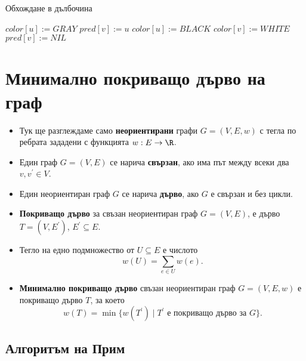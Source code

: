 \begin{algorithm}
  \caption{Обхождане в дълбочина}
  \label{alg:dfs-visit}
  \begin{algorithmic}[1]
    \State $color[u] := GRAY$
    \State $pred[v] := u$
    \State {}
    \EndIf
    \EndFor
    \State $color[u] := BLACK$
    \EndProcedure
    \Statex
    \State $color[v] := WHITE$
    \State $pred[v] := NIL$
    \EndFor    
    \State{}
    \EndIf
    \EndFor
    \EndProcedure
  \end{algorithmic}
\end{algorithm}


\section{Минимално покриващо дърво на граф}


\begin{itemize}
\item
  Тук ще разглеждаме само {\bf неориентирани} графи $G = (V,E,w)$ с тегла по ребрата
  зададени с функцията $w:E\to\R$.
\item
  Един граф $G = (V,E)$ се нарича {\bf свързан}, ако има път между всеки два $v,v^\prime \in V$.
\item 
  Един неориентиран граф $G$ се нарича {\bf дърво}, ако $G$ е свързан и без цикли.
\item
  {\bf Покриващо дърво} за свъзан неориентиран граф $G = (V,E)$,
  е дърво $T = (V,E^\prime)$, $E^\prime \subseteq E$.
\item
  Тегло на едно подмножество от $U \subseteq E$ е числото
  \[w(U) = \sum_{e \in U} w(e).\]
\item
  {\bf Минимално покриващо дърво} свъзан неориентиран граф $G = (V,E,w)$
  е покриващо дърво $T$, за което 
  \[w(T) = \min\{w(T^\prime) \mid T^\prime\mbox{ е покриващо дърво за }G\}.\]
\end{itemize}

\subsection{Алгоритъм на Прим}

